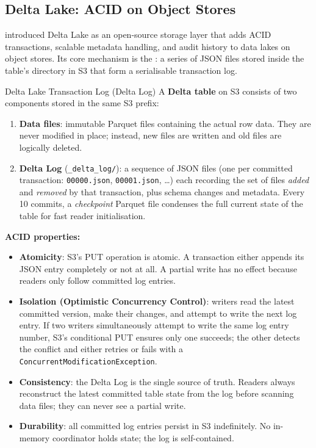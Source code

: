 \subsection{Delta Lake: ACID on Object Stores}
\label{subsec:delta-lake}

\autocite{DeltaLake2020} introduced Delta Lake as an open-source storage
layer that adds ACID transactions, scalable metadata handling, and audit
history to data lakes on object stores. Its core mechanism is the
: a series of JSON files stored inside the table's
directory in S3 that form a serialisable transaction log.

\begin{defbox}{Delta Lake Transaction Log (Delta Log)}
A \textbf{Delta table} on S3 consists of two components stored in the
same S3 prefix:
\begin{enumerate}
  \item \textbf{Data files}: immutable Parquet files containing the actual
        row data. They are never modified in place; instead, new files are
        written and old files are logically deleted.
  \item \textbf{Delta Log} (\texttt{\_delta\_log/}): a sequence of JSON
        files (one per committed transaction: \texttt{00000.json},
        \texttt{00001.json}, \ldots) each recording the set of files
        \emph{added} and \emph{removed} by that transaction, plus schema
        changes and metadata. Every 10 commits, a \emph{checkpoint} Parquet
        file condenses the full current state of the table for fast reader
        initialisation.
\end{enumerate}
\textbf{ACID properties:}
\begin{itemize}
  \item \textbf{Atomicity}: S3's PUT operation is atomic. A transaction
        either appends its JSON entry completely or not at all. A partial
        write has no effect because readers only follow committed log entries.
  \item \textbf{Isolation (Optimistic Concurrency Control)}: writers read
        the latest committed version, make their changes, and attempt to
        write the next log entry. If two writers simultaneously attempt
        to write the same log entry number, S3's conditional PUT ensures
        only one succeeds; the other detects the conflict and either retries
        or fails with a \texttt{ConcurrentModificationException}.
  \item \textbf{Consistency}: the Delta Log is the single source of truth.
        Readers always reconstruct the latest committed table state from
        the log before scanning data files; they can never see a partial
        write.
  \item \textbf{Durability}: all committed log entries persist in S3
        indefinitely. No in-memory coordinator holds state; the log is
        self-contained.
\end{itemize}
\end{defbox}

